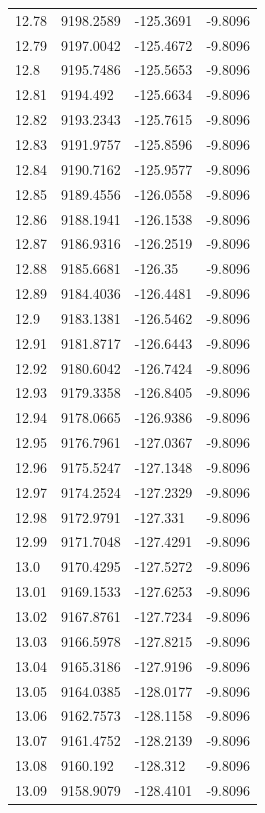 \begin{table}[H]
\begin{tabular}{llll}
12.78 & 9198.2589 & -125.3691 & -9.8096 \\
12.79 & 9197.0042 & -125.4672 & -9.8096 \\
12.8 & 9195.7486 & -125.5653 & -9.8096 \\
12.81 & 9194.492 & -125.6634 & -9.8096 \\
12.82 & 9193.2343 & -125.7615 & -9.8096 \\
12.83 & 9191.9757 & -125.8596 & -9.8096 \\
12.84 & 9190.7162 & -125.9577 & -9.8096 \\
12.85 & 9189.4556 & -126.0558 & -9.8096 \\
12.86 & 9188.1941 & -126.1538 & -9.8096 \\
12.87 & 9186.9316 & -126.2519 & -9.8096 \\
12.88 & 9185.6681 & -126.35 & -9.8096 \\
12.89 & 9184.4036 & -126.4481 & -9.8096 \\
12.9 & 9183.1381 & -126.5462 & -9.8096 \\
12.91 & 9181.8717 & -126.6443 & -9.8096 \\
12.92 & 9180.6042 & -126.7424 & -9.8096 \\
12.93 & 9179.3358 & -126.8405 & -9.8096 \\
12.94 & 9178.0665 & -126.9386 & -9.8096 \\
12.95 & 9176.7961 & -127.0367 & -9.8096 \\
12.96 & 9175.5247 & -127.1348 & -9.8096 \\
12.97 & 9174.2524 & -127.2329 & -9.8096 \\
12.98 & 9172.9791 & -127.331 & -9.8096 \\
12.99 & 9171.7048 & -127.4291 & -9.8096 \\
13.0 & 9170.4295 & -127.5272 & -9.8096 \\
13.01 & 9169.1533 & -127.6253 & -9.8096 \\
13.02 & 9167.8761 & -127.7234 & -9.8096 \\
13.03 & 9166.5978 & -127.8215 & -9.8096 \\
13.04 & 9165.3186 & -127.9196 & -9.8096 \\
13.05 & 9164.0385 & -128.0177 & -9.8096 \\
13.06 & 9162.7573 & -128.1158 & -9.8096 \\
13.07 & 9161.4752 & -128.2139 & -9.8096 \\
13.08 & 9160.192 & -128.312 & -9.8096 \\
13.09 & 9158.9079 & -128.4101 & -9.8096 \\

\end{tabular}
\end{table}
